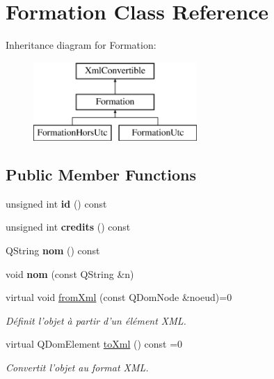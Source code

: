 \hypertarget{classFormation}{\section{Formation Class Reference}
\label{classFormation}
}
Inheritance diagram for Formation\+:\begin{figure}[H]
\begin{center}
\leavevmode
\includegraphics[height=3.000000cm]{classFormation}
\end{center}
\end{figure}
\subsection*{Public Member Functions}
\begin{DoxyCompactItemize}
\item 
\hypertarget{classFormation_ae2554a8a085697bffb5691e9a3eba694}{unsigned int {\bfseries id} () const }\label{classFormation_ae2554a8a085697bffb5691e9a3eba694}

\item 
\hypertarget{classFormation_a94ea9bc0973149c6db430361b0c04367}{unsigned int {\bfseries credits} () const }\label{classFormation_a94ea9bc0973149c6db430361b0c04367}

\item 
\hypertarget{classFormation_aa54c9b0dbe6eec3df39f3c87b8efc4a5}{Q\+String {\bfseries nom} () const }\label{classFormation_aa54c9b0dbe6eec3df39f3c87b8efc4a5}

\item 
\hypertarget{classFormation_a6822ab119dd1cec435dce264d2a07f4b}{void {\bfseries nom} (const Q\+String \&n)}\label{classFormation_a6822ab119dd1cec435dce264d2a07f4b}

\item 
\hypertarget{classFormation_a4c5665c37f7fdaa8421768f9c95aa8c5}{virtual void \hyperlink{classFormation_a4c5665c37f7fdaa8421768f9c95aa8c5}{from\+Xml} (const Q\+Dom\+Node \&noeud)=0}\label{classFormation_a4c5665c37f7fdaa8421768f9c95aa8c5}

\begin{DoxyCompactList}\small\item\em Définit l'objet à partir d'un élément X\+M\+L. \end{DoxyCompactList}\item 
virtual Q\+Dom\+Element \hyperlink{classFormation_aea1a12114f435bba6a32a0a32ca32e47}{to\+Xml} () const =0
\begin{DoxyCompactList}\small\item\em Convertit l'objet au format X\+M\+L. \end{DoxyCompactList}\end{DoxyCompactItemize}


